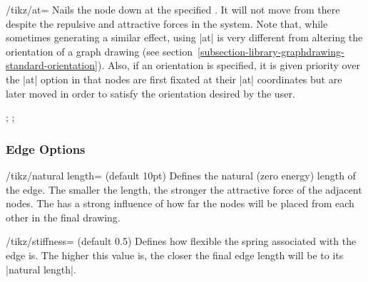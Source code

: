 %

\begin{key}{/tikz/at=}
  Nails the node down at the specified . It will not
  move from there despite the repulsive and attractive forces in the
  system. Note that, while sometimes generating a similar effect, using
  |at| is very different from altering the orientation of a graph
  drawing (see section~\ref{subsection-library-graphdrawing-standard-orientation}).
  Also, if an orientation is specified, it is given priority over
  the |at| option in that nodes are first fixated at their |at|
  coordinates but are later moved in order to satisfy the orientation 
  desired by the user.
  \begin{codeexample}[width=6.0cm]
\tikz {};
\tikz {};
  \end{codeexample}
\end{key}



\subsubsection{Edge Options}

\begin{key}{/tikz/natural length= (default 10pt)}
  Defines the natural (zero energy) length of the edge. The smaller the
  length, the stronger the attractive force of the adjacent nodes. The
   has a strong influence of how far the nodes will be
  placed from each other in the final drawing.
  \begin{codeexample}[]
  \end{codeexample}
\end{key}

\begin{key}{/tikz/stiffness= (default 0.5)}
  Defines how flexible the spring associated with the edge is. The
  higher this value is, the closer the final edge length will be to its
  |natural length|.
  \begin{codeexample}[]
  \end{codeexample}
\end{key}

